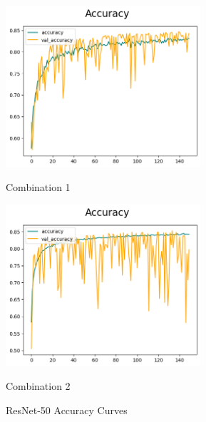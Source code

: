 \begin{figure}[H]
    \centering
    \begin{minipage}[b]{0.49\textwidth}
        \centering
        \includegraphics[width=\textwidth, height=6cm]{Figures/balanced_data/more_data/withoutbn/resnet/accuracy.png}
        \captionsetup{labelformat=empty}
        \caption{Combination 1}
        \label{fig:u_wo_r_a}
    \end{minipage}
    \hfill
    \begin{minipage}[b]{0.49\textwidth}
        \centering
        \includegraphics[width=\textwidth, height=6cm]{Figures/balanced_data/more_data/withbn/resnet/accuracy.png}
        \captionsetup{labelformat=empty}
        \caption{Combination 2}
        \label{fig:u_w_r_a}
    \end{minipage}
    \captionsetup{labelformat=default}
    \caption{ResNet-50 Accuracy Curves}
\end{figure}


